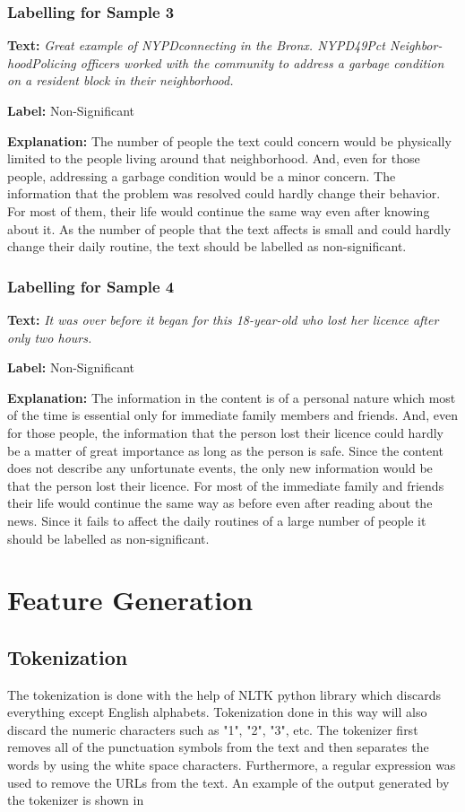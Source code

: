 \subsubsection{Labelling for Sample 3}
\textbf{Text:}
\textit{Great example of NYPDconnecting in the Bronx. NYPD49Pct Neighbor- hoodPolicing officers worked with the community to address a garbage condition on a resident block in their neighborhood.}\par
\textbf{Label:} Non-Significant\par
\textbf{Explanation:} The number of people the text could concern would be physically limited to the people living around that neighborhood. And, even for those people, addressing a garbage condition would be a minor concern. The information that the problem was resolved could hardly change their behavior. For most of them, their life would continue the same way even after knowing about it. As the number of people that the text affects is small and could hardly change their daily routine, the text should be labelled as non-significant.

\subsubsection{Labelling for Sample 4}
\textbf{Text:}
\textit{It was over before it began for this 18-year-old who lost her licence after only two hours.}\par
\textbf{Label:} Non-Significant\par
\textbf{Explanation:} The information in the content is of a personal nature which most of the time is essential only for immediate family members and friends. And, even for those people, the information that the person lost their licence could hardly be a matter of great importance as long as the person is safe. Since the content does not describe any unfortunate events, the only new information would be that the person lost their licence. For most of the immediate family and friends their life would continue the same way as before even after reading about the news. Since it fails to affect the daily routines of a large number of people it should be labelled as non-significant.

\section{Feature Generation}
\subsection{Tokenization}
The tokenization is done with the help of NLTK\cite{loper2002nltk} python library which discards everything except English alphabets.  Tokenization done in this way will also discard the numeric characters such as "1", "2", "3", etc.  The tokenizer first removes all of the punctuation symbols from the text and then separates the words by using the white space characters. Furthermore, a regular expression was used to remove the URLs from the text. An example of the output generated by the tokenizer is shown in 

